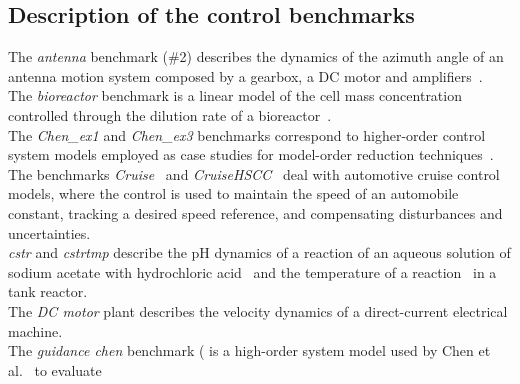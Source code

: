 \documentclass[twocolumn]{autart}    %
\begin{document}
\subsection{Description of the control benchmarks}
\label{exp:benchmarks}

The \textit{antenna} benchmark (\#2) 
describes the dynamics of the azimuth angle of an antenna 
motion system composed by a gearbox, a DC motor and amplifiers~\cite{gajic2008optimal}. \\
The \textit{bioreactor} benchmark is a linear model 
of the cell mass concentration controlled through the dilution rate of a bioreactor~\cite{bioreactor}.\\ 
%
The \textit{Chen\_ex1} and \textit{Chen\_ex3}
benchmarks correspond to higher-order control system 
models employed as case studies for model-order reduction techniques~\cite{CHEN1979389}.  \\
%
The benchmarks \textit{Cruise}~\cite{Franklin15} and \textit{CruiseHSCC}~\cite{Astrom08} deal with automotive cruise control models, 
where the control is used to maintain the speed of an automobile constant, 
tracking a desired speed reference, and compensating disturbances and uncertainties. \\ %
\textit{cstr}  and \textit{cstrtmp}  describe the pH dynamics of a reaction 
of an aqueous solution of sodium acetate with hydrochloric acid~\cite{cstr} and 
the temperature of a reaction~\cite{astrom2006advanced} in a 
tank reactor. \\ 
The \textit{DC motor} plant  describes the velocity 
dynamics of a 
direct-current electrical machine. \\ 
%
The \textit{guidance chen} benchmark ( is a high-order system model used by Chen et al.~\cite{CHEN1979389} to evaluate 
\end{document}
